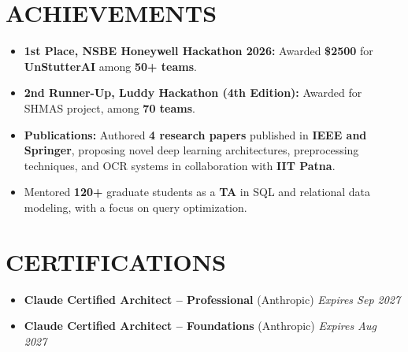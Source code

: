 \documentclass[letterpaper,11pt]{article}
\newcommand{\resumeItem}[1]{\item\small{#1}}
\newcommand{\resumeItemListStart}{
  \begin{itemize}[
    leftmargin=20pt,
    topsep=2pt,
    itemsep=2pt,
    parsep=0pt,
    partopsep=0pt
  ]
}
\newcommand{\resumeItemListEnd}{\end{itemize}}
\begin{document}
 \vspace{-10pt}
\section{ACHIEVEMENTS}
\resumeItemListStart
  \resumeItem{\textbf{1st Place, NSBE Honeywell Hackathon 2026:} Awarded \textbf{\$2500} for \textbf{UnStutterAI} among \textbf{50+ teams}.}
  \resumeItem{\textbf{2nd Runner-Up, Luddy Hackathon (4th Edition):} Awarded for SHMAS project, among \textbf{70 teams}.}
  \resumeItem{\textbf{Publications:} Authored \textbf{4 research papers} published in \textbf{IEEE and Springer}, proposing novel deep learning architectures, preprocessing techniques, and OCR systems in collaboration with \textbf{IIT Patna}.}
  \resumeItem{Mentored \textbf{120+} graduate students as a \textbf{TA} in SQL and relational data modeling, with a focus on query optimization.}
\resumeItemListEnd


\section{CERTIFICATIONS}
\resumeItemListStart
  \resumeItem{\textbf{Claude Certified Architect -- Professional} (Anthropic) \hfill \textit{Expires Sep 2027}}
  \resumeItem{\textbf{Claude Certified Architect -- Foundations} (Anthropic) \hfill \textit{Expires Aug 2027}}
\resumeItemListEnd
\end{document}
